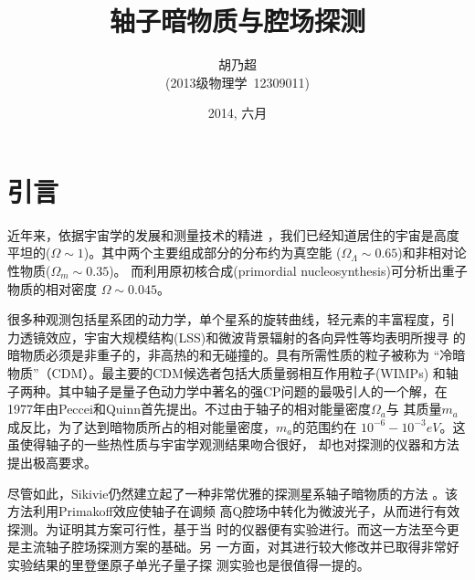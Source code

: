 \documentclass[twocolumn,12pt,a4paper]{article}
\title{轴子暗物质与腔场探测}
\author{胡乃超\\(2013级物理学\, 12309011)}
\date{2014, 六月}
\begin{document}

\renewcommand{\contentsname}{目录}
\tableofcontents

\section{引言}
近年来，依据宇宙学的发展和测量技术的精进
\cite{hanany00}\cite{perlmutter99}，我们已经知道居住的宇宙是高度
平坦的($\Omega \sim 1$)。其中两个主要组成部分的分布约为真空能
($\Omega_{\Lambda} \sim 0.65$)和非相对论性物质($\Omega_m \sim 0.35$)。
而利用原初核合成(primordial nucleosynthesis)可分析出重子物质的相对密度
$\Omega \sim 0.045$\cite{schramm98}。\par
很多种观测包括星系团的动力学，单个星系的旋转曲线，轻元素的丰富程度，引
力透镜效应，宇宙大规模结构(LSS)和微波背景辐射的各向异性等均表明所搜寻
的暗物质必须是非重子的，非高热的和无碰撞的。具有所需性质的粒子被称为
``冷暗物质''（CDM）。最主要的CDM候选者包括大质量弱相互作用粒子(WIMPs)
和轴子两种。其中轴子是量子色动力学中著名的强CP问题的最吸引人的一个解，在
1977年由Peccei和Quinn首先提出。不过由于轴子的相对能量密度$\Omega_a$与
其质量$m_a$成反比，为了达到暗物质所占的相对能量密度，$m_a$的范围约在
$10^{-6}-10^{-3}eV$。这虽使得轴子的一些热性质与宇宙学观测结果吻合很好\cite{sikivie12}，
却也对探测的仪器和方法提出极高要求。\par
尽管如此，Sikivie仍然建立起了一种非常优雅的探测星系轴子暗物质的方法
\cite{sikivie83a}\cite{sikivie85}。该方法利用Primakoff效应使轴子在调频
高Q腔场中转化为微波光子，从而进行有效探测。为证明其方案可行性，基于当
时的仪器便有实验进行。而这一方法至今更是主流轴子腔场探测方案的基础。另
一方面，对其进行较大修改并已取得非常好实验结果的里登堡原子单光子量子探
测实验也是很值得一提的。
\end{document}
